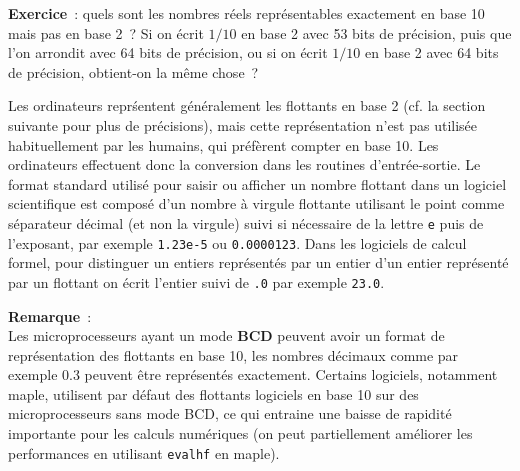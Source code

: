 \documentclass[a4paper,11pt]{article}
\begin{document}
\begin{giacjshere}
{\bf Exercice}~: quels sont les nombres r\'eels repr\'esentables exactement
en base 10 mais pas en base 2~?
Si on écrit $1/10$ en base 2 avec 53 bits de précision, puis que
l'on arrondit avec 64 bits de précision, ou si on écrit $1/10$ en
base 2 avec 64 bits de précision, obtient-on la même chose~?

Les ordinateurs repr\'sentent g\'en\'eralement les flottants en base 2 
(cf. la section suivante pour
plus de pr\'ecisions), mais cette repr\'esentation n'est pas utilis\'ee
habituellement par les humains, qui pr\'ef\`erent compter
en base 10. Les ordinateurs effectuent donc la conversion dans
les routines d'entr\'ee-sortie. Le format standard utilis\'e
pour saisir ou afficher un nombre flottant dans un logiciel
scientifique est compos\'e d'un nombre \`a virgule
flottante utilisant le point comme s\'eparateur d\'ecimal (et
non la virgule) suivi si n\'ecessaire de la lettre \verb|e| puis de l'exposant,
par exemple \verb|1.23e-5| ou \verb|0.0000123|. Dans les
logiciels de calcul formel, pour distinguer un entiers
repr\'esent\'es par un entier
d'un entier repr\'esent\'e par un flottant on \'ecrit
l'entier suivi de \verb|.0| par exemple \verb|23.0|.

{\bf Remarque}~:\\
Les microprocesseurs ayant un mode {\bf BCD} peuvent avoir un format
de repr\'esentation des flottants en base 10, les nombres d\'ecimaux
comme par exemple 0.3 peuvent \^etre repr\'esent\'es exactement. 
Certains logiciels, notamment maple, utilisent par d\'efaut des
flottants logiciels en base 10 sur des microprocesseurs sans mode BCD, 
ce qui entraine une baisse de
rapidit\'e importante pour les calculs num\'eriques (on peut
partiellement am\'eliorer les performances en utilisant \verb|evalhf|
en maple).


\end{giacjshere}
\end{document}

